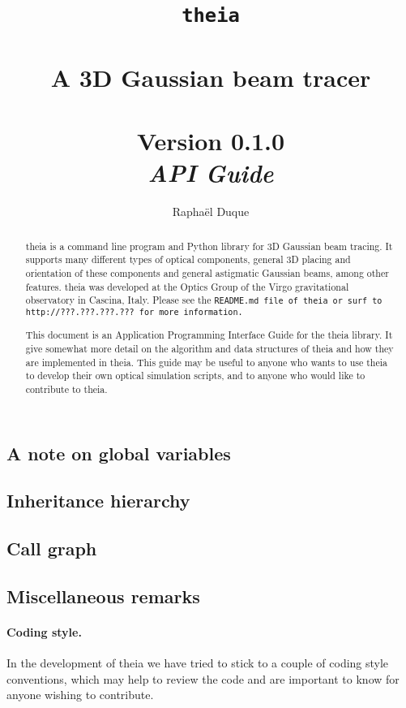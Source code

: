 \documentclass{article}
\title{\texttt{theia} \\ \quad \\A 3D Gaussian beam tracer \\ \quad \\ Version 0.1.0 \\ \textit{API Guide}}
\author{Rapha\"el Duque}
\begin{document}
\maketitle
\begin{abstract}
theia is a command line program and Python library for 3D Gaussian beam tracing. It supports many different types of optical components, general 3D placing and orientation of these components and general astigmatic Gaussian beams, among other features. theia was developed at the Optics Group of the Virgo gravitational observatory in Cascina, Italy. Please see the \tt{README.md} file of \tt{theia} or surf to \tt{http://???.???.???.???} for more information.

This document is an Application Programming Interface Guide for the theia library. It give somewhat more detail on the algorithm and data structures of theia and how they are implemented in theia. This guide may be useful to anyone who wants to use theia to develop their own optical simulation scripts, and to anyone who would like to contribute to theia.
\end{abstract}

\newpage

\subsection{A note on global variables}

\subsection{Inheritance hierarchy}

\subsection{Call graph}

\subsection{Miscellaneous remarks}

\paragraph{Coding style.}In the development of theia we have tried to stick to a couple of coding style conventions, which may help to review the code and are important to know for anyone wishing to contribute.
\end{document}
